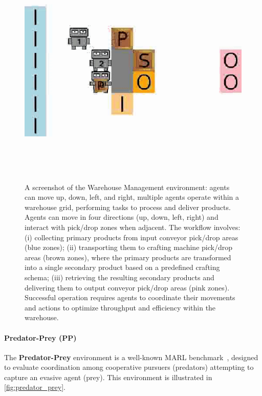 \documentclass[pdflatex,sn-mathphys-num]{sn-jnl}%
\theoremstyle{thmstyleone}%
\theoremstyle{thmstyletwo}%
\theoremstyle{thmstylethree}%
\begin{document}
\begin{figure}[h!]
    \centering
    \includegraphics[width=0.6\linewidth]{figures/wm.png}
    \caption{A screenshot of the Warehouse Management environment: agents can move up, down, left, and right, multiple agents operate within a warehouse grid, performing tasks to process and deliver products. Agents can move in four directions (up, down, left, right) and interact with pick/drop zones when adjacent. The workflow involves: (i) collecting primary products from input conveyor pick/drop areas (blue zones); (ii) transporting them to crafting machine pick/drop areas (brown zones), where the primary products are transformed into a single secondary product based on a predefined crafting schema; (iii) retrieving the resulting secondary products and delivering them to output conveyor pick/drop areas (pink zones). Successful operation requires agents to coordinate their movements and actions to optimize throughput and efficiency within the warehouse.}
    \label{fig:warehouse}
\end{figure}

\paragraph{Predator-Prey (PP)}
The \textbf{Predator-Prey} environment is a well-known MARL benchmark~\cite{lowe2017multi}, designed to evaluate coordination among cooperative pursuers (predators) attempting to capture an evasive agent (prey). This environment is illustrated in \autoref{fig:predator_prey}.
\end{document}
